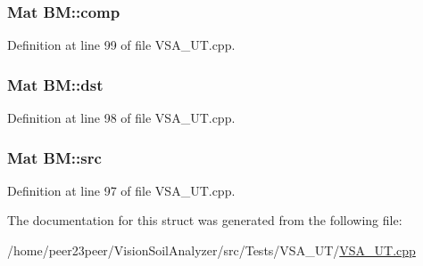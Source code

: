 \subsubsection[{comp}]{\setlength{\rightskip}{0pt plus 5cm}Mat B\+M\+::comp}\label{struct_b_m_a91a2c5f22e9d50eef5fb7447d986e081}


Definition at line 99 of file V\+S\+A\+\_\+\+U\+T.\+cpp.

\hypertarget{struct_b_m_a5dcd272086f1e23ec2c205a902dca28d}{}
\subsubsection[{dst}]{\setlength{\rightskip}{0pt plus 5cm}Mat B\+M\+::dst}\label{struct_b_m_a5dcd272086f1e23ec2c205a902dca28d}


Definition at line 98 of file V\+S\+A\+\_\+\+U\+T.\+cpp.

\hypertarget{struct_b_m_a16e469d839cd52f63a935fb65d5f2f37}{}
\subsubsection[{src}]{\setlength{\rightskip}{0pt plus 5cm}Mat B\+M\+::src}\label{struct_b_m_a16e469d839cd52f63a935fb65d5f2f37}


Definition at line 97 of file V\+S\+A\+\_\+\+U\+T.\+cpp.



The documentation for this struct was generated from the following file\+:\begin{DoxyCompactItemize}
\item 
/home/peer23peer/\+Vision\+Soil\+Analyzer/src/\+Tests/\+V\+S\+A\+\_\+\+U\+T/\hyperlink{_v_s_a___u_t_8cpp}{V\+S\+A\+\_\+\+U\+T.\+cpp}\end{DoxyCompactItemize}
